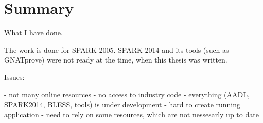 
\cleardoublepage


\chapter{Summary}
\label{summary}

What I have done.

The work is done for SPARK 2005. SPARK 2014 and its tools (such as GNATprove) were not ready at the time, when this thesis was written.

Issues:

- not many online resources
- no access to industry code
- everything (AADL, SPARK2014, BLESS, tools) is under development
- hard to create running application
- need to rely on some resources, which are not nessesarly up to date
